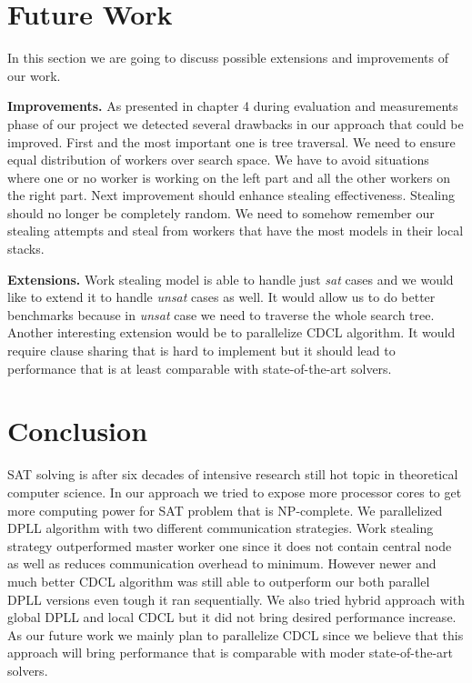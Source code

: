 \documentclass[letterpaper]{article}
\newcommand{\mypar}[1]{{\bf #1.}}
\begin{document}
\section{Future Work}
In this section we are going to discuss possible extensions and improvements of our work.

\mypar{Improvements} As presented in chapter 4 during evaluation and measurements phase of our project we detected several drawbacks in our approach that could be improved. First and the most important one is tree traversal. We need to ensure equal distribution of workers over search space. We have to avoid situations where one or no worker is working on the left part and all the other workers on the right part. Next improvement should enhance stealing effectiveness. Stealing should no longer be completely random. We need to somehow remember our stealing attempts and steal from workers that have the most models in their local stacks. 

\mypar{Extensions} Work stealing model is able to handle just \textit{sat} cases and we would like to extend it to handle \textit{unsat} cases as well. It would allow us to do better benchmarks because in \textit{unsat} case we need to traverse the whole search tree. Another interesting extension would be to parallelize CDCL algorithm. It would require clause sharing that is hard to implement but it should lead to performance that is at least comparable with state-of-the-art solvers. 

\section{Conclusion}

SAT solving is after six decades of intensive research still hot topic in theoretical computer science. In our approach we tried to expose more processor cores to get more computing power for SAT problem that is NP-complete. We parallelized DPLL algorithm with two different communication strategies. Work stealing strategy outperformed master worker one since it does not contain central node as well as reduces communication overhead to minimum. However newer and much better CDCL algorithm was still able to outperform our both parallel DPLL versions even tough it ran sequentially. We also tried hybrid approach with global DPLL and local CDCL but it did not bring desired performance increase. As our future work we mainly plan to parallelize CDCL since we believe that this approach will bring performance that is comparable with moder state-of-the-art solvers.
\end{document}
